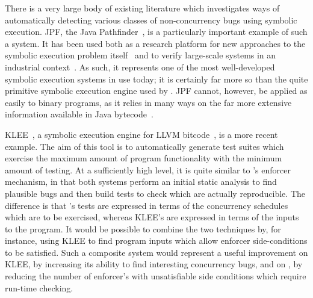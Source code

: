 There is a very large body of existing literature which investigates
ways of automatically detecting various classes of non-concurrency
bugs using symbolic execution.  JPF, the Java
Pathfinder~\cite{Havelund2000}, is a particularly important example of
such a system.  It has been used both as a research platform for new
approaches to the symbolic execution problem
itself~\cite{D'Amorim2008,Gligoric2010} and to verify large-scale
systems in an industrial context~\cite{FFFPCZsCZreanu2008}.  As such,
it represents one of the most well-developed symbolic execution
systems in use today; it is certainly far more so than the quite
primitive symbolic execution engine used by {\technique}.  JPF cannot,
however, be applied as easily to binary programs, as it relies in many
ways on the far more extensive information available in Java
bytecode~\cite{Lindholm2013}.

KLEE~\cite{Cadar}, a symbolic execution engine for LLVM
bitcode~\cite{FFFLattner2013}, is a more recent example.  The aim of
this tool is to automatically generate test suites which exercise the
maximum amount of program functionality with the minimum amount of
testing.  At a sufficiently high level, it is quite similar to
{\technique}'s enforcer mechanism, in that both systems perform an
initial static analysis to find plausible bugs and then build tests to
check which are actually reproducible.  The difference is that
{\technique}'s tests are expressed in terms of the concurrency
schedules which are to be exercised, whereas KLEE's are expressed in
terms of the inputs to the program.  It would be possible to combine the two techniques by,
for instance, using KLEE to find program inputs which allow
{\technique} enforcer side-conditions to be satisfied.  Such a
composite system would represent a useful improvement on KLEE, by
increasing its ability to find interesting concurrency bugs, and on
{\technique}, by reducing the number of enforcer's with unsatisfiable
side conditions which require run-time checking.

